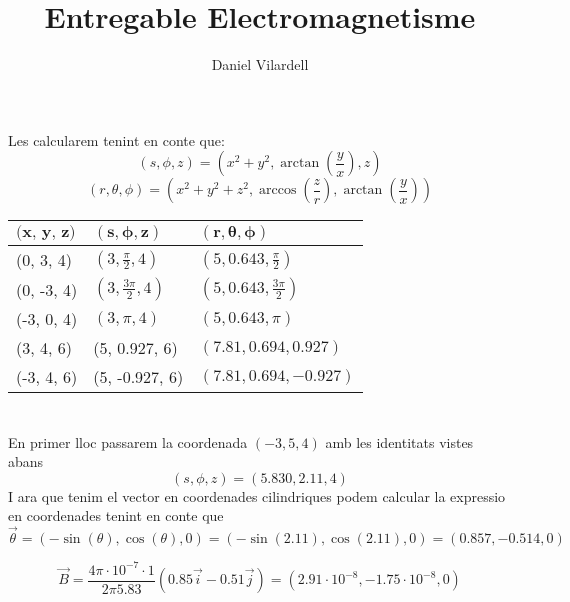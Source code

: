 \documentclass[12pt, a4papre]{article}
\author{Daniel Vilardell}
\title{Entregable Electromagnetisme}
\date{}
\begin{document}
	\maketitle
	\section{}
	Les calcularem tenint en conte que:
	\[
		(s, \phi, z) = (x^2 + y^2, \arctan\left(\frac{y}{x}\right), z)
	\]
	\[
		(r, \theta, \phi) = (x^2 + y^2 + z^2, \arccos\left(\frac{z}{r}\right),  \arctan\left(\frac{y}{x}\right))
	\]
	\begin{center}
		{\renewcommand{\arraystretch}{1.3}
		\begin{tabular}{ |>{\centering\arraybackslash}p{} | >{\centering\arraybackslash}p{} | >{\centering\arraybackslash}p{} |}
			\hline
			$\textbf{(x, y, z)}$			& $\pmb{(s, \phi, z)}$			& $\pmb{(r, \theta, \phi)}$		\\ \hline
			(0, 3, 4)	 				& $(3, \frac{\pi}{2}, 4)$  		& $(5, 0.643, \frac{\pi}{2})$	\\ \hline
			(0, -3, 4)					& $(3, \frac{3\pi}{2}, 4)$ 		& $(5, 0.643, \frac{3\pi}{2})$		\\ \hline
			(-3, 0, 4) 					& $(3, \pi, 4)$ 				& $(5, 0.643, \pi)$				\\ \hline
			(3, 4, 6)					& (5, 0.927, 6) 				& $(7.81, 0.694, 0.927)$			\\ \hline
			(-3, 4, 6) 					& (5, -0.927, 6) 				& $(7.81, 0.694, -0.927)$			\\
			\hline
		\end{tabular}
		}
	\end{center}
	
	\section{}
	En primer lloc passarem la coordenada $(-3, 5, 4)$ amb les identitats vistes abans
	\[
		(s, \phi, z) = (5.830, 2.11, 4)
	\]
	I ara que tenim el vector en coordenades cilindriques podem calcular la expressio en coordenades tenint en conte que 
	\[
		\vec{\theta}=(-\sin(\theta), \cos(\theta), 0) = (-\sin(2.11), \cos(2.11), 0) = (0.857, -0.514, 0)
	\]
	
	\[
	\vec{B} = \frac{4\pi\cdot 10^{-7}\cdot 1}{2\pi 5.83}(0.85\vec{i} - 0.51\vec{j}) = (2.91\cdot10^{-8}, -1.75\cdot10^{-8}, 0)
	\]
	
\end{document}
